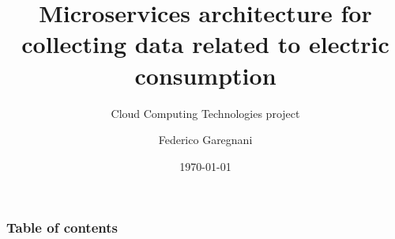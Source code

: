 \documentclass{beamer}
\title[Cloud Comp. Technologies project]{Microservices architecture for collecting data related to electric consumption}
\subtitle{Cloud Computing Technologies project}
\author{Federico Garegnani}
\institute[UniMI]{Università degli Studi di Milano}
\date{\today}
\begin{document}
	\frame{\titlepage}
	
	\begin{frame}
		\frametitle{Table of contents}
		\tableofcontents
	\end{frame}
	
	
	
	
	
\end{document}
